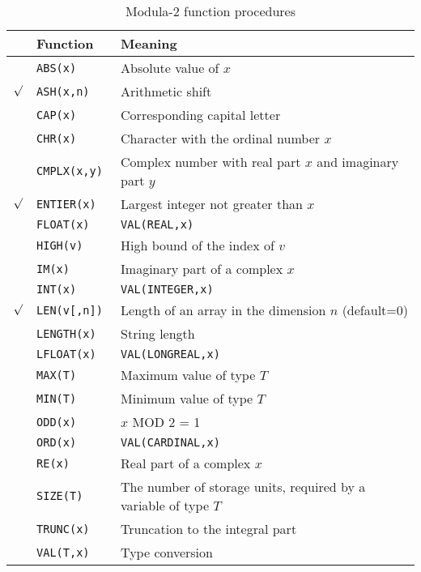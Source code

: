 \begin{table}[htb]
\begin{center}
\begin{tabular}{clp{8cm}}
&\bf Function &\bf  Meaning \\  \hline
&\tt ABS(x)   & Absolute value of $x$ \\              \index{ABS}
$\surd$&\tt ASH(x,n) & Arithmetic shift    \\              \index{ASH}
&\tt CAP(x)   & Corresponding capital letter    \\  \index{CAP}
&\tt CHR(x)   & Character with the ordinal number $x$ \\  \index{CHR}
&\tt CMPLX(x,y) & Complex number with real part $x$
                  and imaginary part $y$           \\ \index{CMPLX}
$\surd$&\tt ENTIER(x) & Largest integer not greater than $x$ \\ \index{ENTIER}
&\tt FLOAT(x) &\tt  VAL(REAL,x) \\                     \index{FLOAT}
&\tt HIGH(v)  &  High bound of the index of $v$  \\    \index{HIGH}
&\tt IM(x)    & Imaginary part of a complex $x$ \\         \index{IM}
&\tt INT(x)   &\tt VAL(INTEGER,x)          \\         \index{INT}
$\surd$&\tt LEN(v[,n]) &  Length of an array
           in the dimension $n$ (default=0) \\    \index{LEN}
&\tt LENGTH(x) & String length           \\         \index{LENGTH}
&\tt LFLOAT(x) &\tt VAL(LONGREAL,x) \\                 \index{LFLOAT}
&\tt MAX(T)   &  Maximum value of type $T$ \\         \index{MAX}
&\tt MIN(T)   &  Minimum value of type $T$ \\         \index{MIN}
&\tt ODD(x)   & $x$ MOD 2 = 1 \\                      \index{ODD}
&\tt ORD(x)   &\tt VAL(CARDINAL,x)    \\               \index{ORD (M2)}
&\tt RE(x)    & Real part of a complex $x$ \\         \index{RE}
&\tt SIZE(T)  & The number of storage units,
               required by a variable of type $T$  \\ \index{SIZE}
&\tt TRUNC(x) & Truncation to the integral part      \\ \index{TRUNC}
&\tt VAL(T,x) & Type conversion            \index{VAL (M2)}
\end{tabular}
\end{center}
\caption{Modula-2 function procedures}\label{table:m2:stdfunc}
\end{table}

